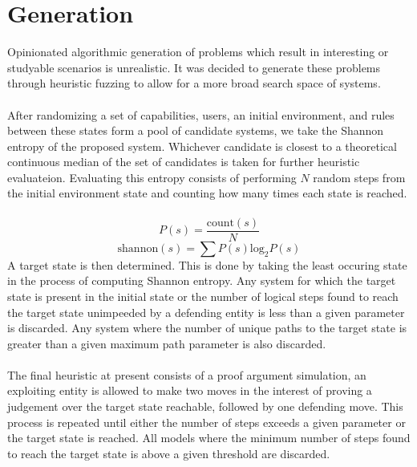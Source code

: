 \documentclass{article}
\begin{document}
	\section{Generation}
	Opinionated algorithmic generation of problems which result in interesting or studyable scenarios is unrealistic. It was decided to generate these problems through heuristic fuzzing to allow for a more broad search space of systems.\\\\
	After randomizing a set of capabilities, users, an initial environment, and rules between these states form a pool of candidate systems, we take the Shannon entropy of the proposed system. Whichever candidate is closest to a theoretical continuous median of the set of candidates is taken for further heuristic evaluateion. Evaluating this entropy consists of performing $N$ random steps from the initial environment state and counting how many times each state is reached.\\\\
	$$P(s) = \frac{\text{count}(s)}{N}$$
	$$\text{shannon}(s) = \sum{}P(s) \text{log}_2 P(s)$$
	A target state is then determined. This is done by taking the least occuring state in the process of computing Shannon entropy. Any system for which the target state is present in the initial state or the number of logical steps found to reach the target state unimpeeded by a defending entity is less than a given parameter is discarded. Any system where the number of unique paths to the target state is greater than a given maximum path parameter is also discarded. \\\\
	The final heuristic at present consists of a proof argument simulation, an exploiting entity is allowed to make two moves in the interest of proving a judgement over the target state reachable, followed by one defending move. This process is repeated until either the number of steps exceeds a given parameter or the target state is reached. All models where the minimum number of steps found to reach the target state is above a given threshold are discarded. \\\\
\end{document}
